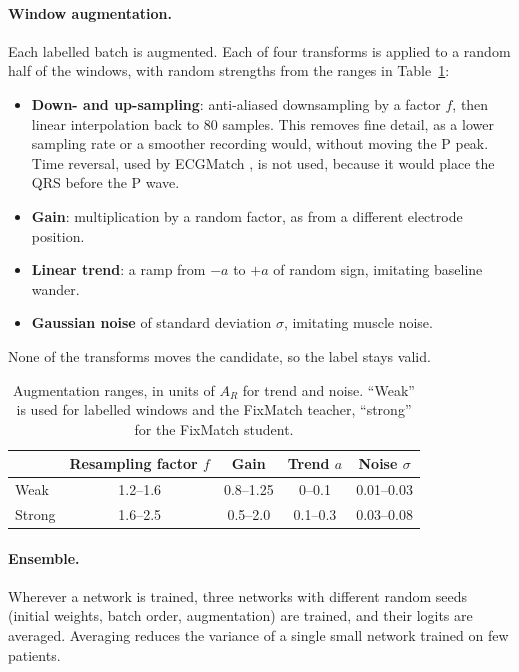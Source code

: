 \documentclass[11pt,a4paper]{article}
\begin{document}
\paragraph{Window augmentation.} Each labelled batch is augmented. Each of four transforms is applied to a random half of the windows, with random strengths from the ranges in Table~\ref{tab:aug}:
\begin{itemize}
\item \textbf{Down- and up-sampling}: anti-aliased downsampling by a factor $f$, then linear interpolation back to 80 samples. This removes fine detail, as a lower sampling rate or a smoother recording would, without moving the P peak. Time reversal, used by ECGMatch \cite{ecgmatch}, is not used, because it would place the QRS before the P wave.
\item \textbf{Gain}: multiplication by a random factor, as from a different electrode position.
\item \textbf{Linear trend}: a ramp from $-a$ to $+a$ of random sign, imitating baseline wander.
\item \textbf{Gaussian noise} of standard deviation $\sigma$, imitating muscle noise.
\end{itemize}
None of the transforms moves the candidate, so the label stays valid.

\begin{table}[ht]
\centering
\caption{Augmentation ranges, in units of $A_R$ for trend and noise. ``Weak'' is used for labelled windows and the FixMatch teacher, ``strong'' for the FixMatch student.}
\label{tab:aug}
\small
\begin{tabular}{lcccc}
\toprule
& Resampling factor $f$ & Gain & Trend $a$ & Noise $\sigma$ \\
\midrule
Weak & 1.2--1.6 & 0.8--1.25 & 0--0.1 & 0.01--0.03 \\
Strong & 1.6--2.5 & 0.5--2.0 & 0.1--0.3 & 0.03--0.08 \\
\bottomrule
\end{tabular}
\end{table}

\paragraph{Ensemble.} Wherever a network is trained, three networks with different random seeds (initial weights, batch order, augmentation) are trained, and their logits are averaged. Averaging reduces the variance of a single small network trained on few patients.
\end{document}
